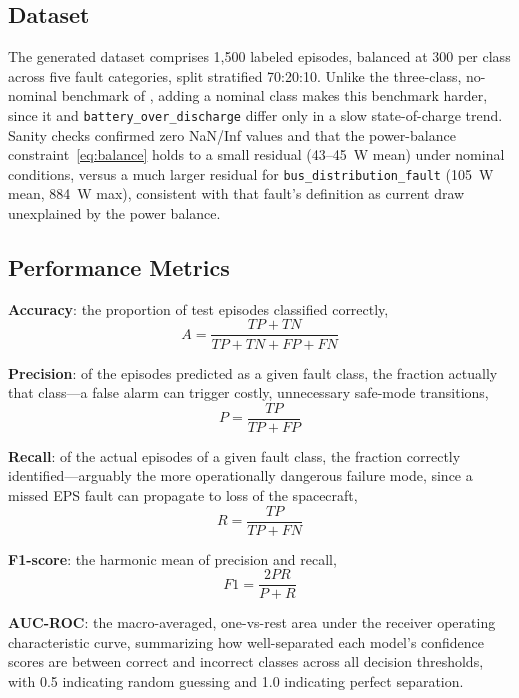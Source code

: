 \documentclass[conference]{IEEEtran}
\begin{document}
\subsection{Dataset}

The generated dataset comprises 1,500 labeled episodes, balanced at 300 per class across five
fault categories, split stratified 70:20:10. Unlike the three-class, no-nominal benchmark of
\cite{b1}, adding a nominal class makes this benchmark harder, since it and
\texttt{battery\_over\_discharge} differ only in a slow state-of-charge trend. Sanity checks
confirmed zero NaN/Inf values and that the power-balance constraint~\eqref{eq:balance} holds
to a small residual (43--45~W mean) under nominal conditions, versus a much larger residual
for \texttt{bus\_distribution\_fault} (105~W mean, 884~W max), consistent with that fault's
definition as current draw unexplained by the power balance.

\subsection{Performance Metrics}

\textbf{Accuracy}: the proportion of test episodes classified correctly,
\begin{equation}
A = \frac{TP+TN}{TP+TN+FP+FN}
\label{eq:acc}
\end{equation}

\textbf{Precision}: of the episodes predicted as a given fault class, the fraction actually
that class---a false alarm can trigger costly, unnecessary safe-mode transitions,
\begin{equation}
P = \frac{TP}{TP+FP}
\label{eq:prec}
\end{equation}

\textbf{Recall}: of the actual episodes of a given fault class, the fraction correctly
identified---arguably the more operationally dangerous failure mode, since a missed EPS
fault can propagate to loss of the spacecraft,
\begin{equation}
R = \frac{TP}{TP+FN}
\label{eq:recall}
\end{equation}

\textbf{F1-score}: the harmonic mean of precision and recall,
\begin{equation}
F1 = \frac{2PR}{P+R}
\label{eq:f1}
\end{equation}

\textbf{AUC-ROC}: the macro-averaged, one-vs-rest area under the receiver operating
characteristic curve, summarizing how well-separated each model's confidence scores are
between correct and incorrect classes across all decision thresholds, with 0.5 indicating
random guessing and 1.0 indicating perfect separation.
\end{document}
